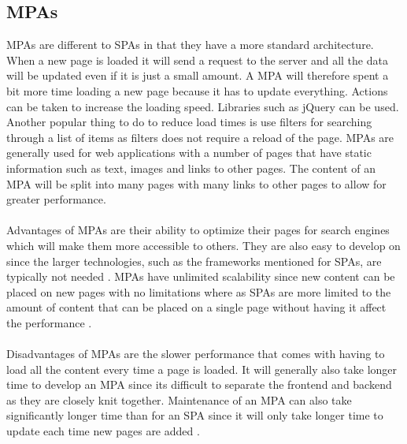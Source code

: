 \subsection{MPAs}
MPAs are different to SPAs in that they have a more standard architecture. When a new page is loaded it will send a request to the server and all the data will be updated even if it is just a small amount. A MPA will therefore spent a bit more time loading a new page because it has to update everything.
Actions can be taken to increase the loading speed. 
Libraries such as jQuery can be used.
Another popular thing to do to reduce load times is use filters for searching through a list of items as filters does not require a reload of the page.
MPAs are generally used for web applications with a number of pages that have static information such as text, images and links to other pages. The content of an MPA will be split into many pages with many links to other pages to allow for greater performance.
\\\\
Advantages of MPAs are their ability to optimize their pages for search engines which will make them more accessible to others. 
They are also easy to develop on since the larger technologies, such as the frameworks mentioned for SPAs, are typically not needed \cite{SPAvsMPAMerehead}.
MPAs have unlimited scalability since new content can be placed on new pages with no limitations where as SPAs are more limited to the amount of content that can be placed on a single page without having it affect the performance \cite{SPAvsMPARuby}.
\\\\
Disadvantages of MPAs are the slower performance that comes with having to load all the content every time a page is loaded.
It will generally also take longer time to develop an MPA since its difficult to separate the frontend and backend as they are closely knit together.
Maintenance of an MPA can also take significantly longer time than for an SPA since it will only take longer time to update each time new pages are added \cite{SPAvsMPARuby}. 


